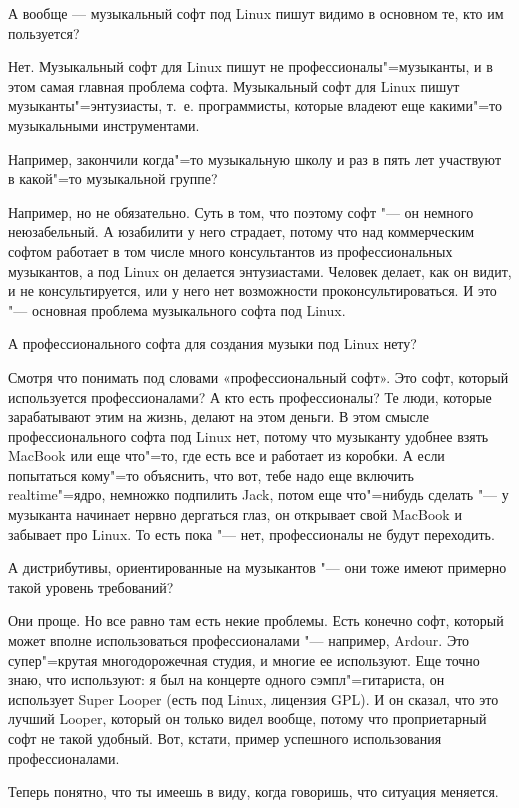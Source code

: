 \documentclass[10pt, a5paper]{article}
\begin{document}
\q А вообще — музыкальный софт под Linux пишут видимо в основном те, кто им пользуется?

\a Нет. Музыкальный софт для Linux пишут не профессионалы"=музыканты, и в этом самая главная проблема софта. Музыкальный софт для Linux пишут музыканты"=энтузиасты, т.~е. программисты, которые владеют еще какими"=то музыкальными инструментами.

\q Например, закончили когда"=то музыкальную школу и раз в пять лет участвуют в какой"=то музыкальной группе?

\a Например, но не обязательно. Суть в том, что поэтому софт "--- он немного неюзабельный. А юзабилити у него страдает, потому что над коммерческим софтом работает в том числе много консультантов из профессиональных музыкантов, а под Linux он делается энтузиастами. Человек делает, как он видит, и не консультируется, или у него нет возможности проконсультироваться. И это "--- основная проблема музыкального софта под Linux.

\q А профессионального софта для создания музыки под Linux нету?

\a Смотря что понимать под словами «профессиональный софт». Это софт, который используется профессионалами? А кто есть профессионалы? Те люди, которые зарабатывают этим на жизнь, делают на этом деньги. В этом смысле профессионального софта под Linux нет, потому что музыканту удобнее взять MacBook или еще что"=то, где есть все и работает из коробки. А если попытаться кому"=то объяснить, что вот, тебе надо еще включить realtime"=ядро, немножко подпилить Jack, потом еще что"=нибудь сделать "--- у музыканта начинает нервно дергаться глаз, он открывает свой MacBook и забывает про Linux. То есть пока "--- нет, профессионалы не будут переходить. 

\q А дистрибутивы, ориентированные на музыкантов "--- они тоже имеют примерно такой уровень требований?

\a Они проще. Но все равно там есть некие проблемы. Есть конечно софт, который может вполне использоваться профессионалами "--- например, Ardour. Это супер"=крутая многодорожечная студия, и многие ее используют. Еще точно знаю, что используют: я был на концерте одного сэмпл"=гитариста, он использует Super Looper (есть под Linux, лицензия GPL). И он сказал, что это лучший Looper, который он только  видел вообще, потому что проприетарный софт не такой удобный. Вот, кстати, пример успешного использования профессионалами.

\q Теперь понятно, что ты имеешь в виду, когда говоришь, что ситуация меняется.
\end{document}
